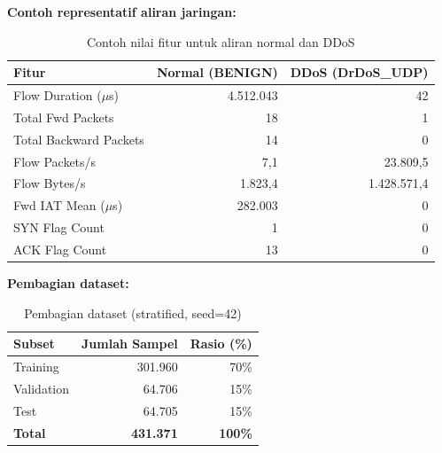 \documentclass[11pt,a4paper,oneside]{report}
\begin{document}
\textbf{Contoh representatif aliran jaringan:}
\begin{table}[h!]
\centering
\caption{Contoh nilai fitur untuk aliran normal dan DDoS}
\label{tab:contoh-sampel}
\begin{tabular}{lrr}
\toprule
\textbf{Fitur} & \textbf{Normal (BENIGN)} & \textbf{DDoS (DrDoS\_UDP)} \\
\midrule
Flow Duration ($\mu$s)         & 4.512.043 & 42 \\
Total Fwd Packets              & 18        & 1 \\
Total Backward Packets         & 14        & 0 \\
Flow Packets/s                 & 7,1       & 23.809,5 \\
Flow Bytes/s                   & 1.823,4   & 1.428.571,4 \\
Fwd IAT Mean ($\mu$s)         & 282.003   & 0 \\
SYN Flag Count                 & 1         & 0 \\
ACK Flag Count                 & 13        & 0 \\
\bottomrule
\end{tabular}
\end{table}

\textbf{Pembagian dataset:}

\begin{table}[h!]
\centering
\caption{Pembagian dataset (stratified, seed=42)}
\label{tab:split-data}
\begin{tabular}{lrr}
\toprule
\textbf{Subset} & \textbf{Jumlah Sampel} & \textbf{Rasio (\%)} \\
\midrule
Training   & 301.960 & 70\% \\
Validation & 64.706  & 15\% \\
Test       & 64.705  & 15\% \\
\midrule
\textbf{Total} & \textbf{431.371} & \textbf{100\%} \\
\bottomrule
\end{tabular}
\end{table}
\end{document}
